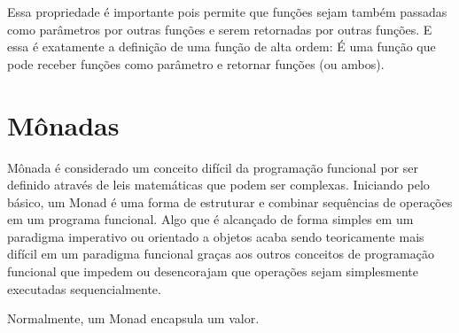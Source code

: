 Essa propriedade é importante pois permite que funções 
sejam também passadas como parâmetros por outras funções e 
serem retornadas por outras funções. E essa é exatamente a 
definição de uma função de alta ordem: É uma função que 
pode receber funções como parâmetro e retornar funções (ou 
ambos).

\section{Mônadas}

Mônada é considerado um conceito difícil da programação 
funcional por ser definido através de leis matemáticas 
que podem ser complexas. Iniciando pelo básico, um Monad 
é uma forma de estruturar e combinar sequências de 
operações em um programa funcional. Algo que é alcançado 
de forma simples em um paradigma imperativo ou orientado 
a objetos acaba sendo teoricamente mais difícil em um 
paradigma funcional graças aos outros conceitos de 
programação funcional que impedem ou desencorajam que 
operações sejam simplesmente executadas sequencialmente.

Normalmente, um Monad encapsula um valor.
